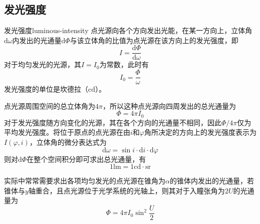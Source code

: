 \documentclass[cn,10pt,chinesefont=founder,math=mtpro2,cite=super,toc=onecol,twoside,openany]{elegantbook}
\begin{document}
\subsection{发光强度}
\begin{definition}{发光强度}{luminous-intensity}
点光源向各个方向发出光能，在某一方向上，立体角$\mathrm{d}\omega$内发出的光通量$\mathrm{d}\varPhi$与该立体角的比值为点光源在该方向上的发光强度，即
\begin{equation}
I=\frac{\mathrm{d}\varPhi}{\mathrm{d}\omega}
\end{equation}
对于均匀发光的光源，其$I=I_0$为常数，此时有
\begin{equation}
I_0=\frac{\varPhi}{\omega}
\end{equation}
发光强度的单位是坎德拉（$\mathrm{cd}$）。
\end{definition}
点光源周围空间的总立体角为$4\pi$，所以这种点光源向四周发出的总光通量为
\begin{equation}
\varPhi=4\pi I_0
\end{equation}
对于发光强度随方向变化的光源，其在各个方向的光通量不相同，因此$\varPhi/4\pi$仅为平均发光强度。将位于原点的点光源在由$i$和$\varphi$角所决定的方向上的发光强度表示为$I(\varphi,i)$，立体角的微分表达式为
\begin{equation}
\mathrm{d}\omega=\sin i\cdot\mathrm{d}i\cdot\mathrm{d}\varphi
\end{equation}
则对$\mathrm{d}\varPhi$在整个空间积分即可求出总光通量，有
\begin{equation}
1\mathrm{lm}=1\mathrm{cd}\cdot\mathrm{sr}
\end{equation}
\begin{note}
	实际中常常需要求出各项均匀发光的点光源在锥角为$\alpha$的锥体内发出的光通量，若锥体与$y$轴重合，且点光源位于光学系统的光轴上，则其对于入瞳张角为$2U$的光通量为
	\begin{equation}
	\varPhi=4\pi I_0\sin^2\frac{U}{2}
	\end{equation}
\end{note}
\end{document}

